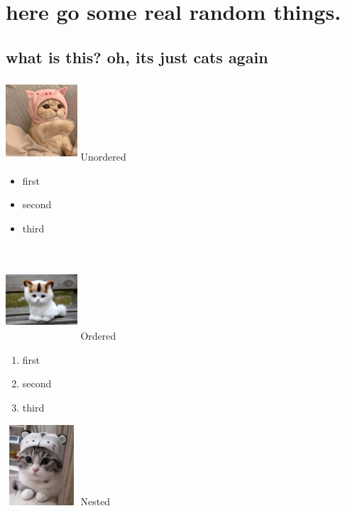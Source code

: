 \documentclass[10pt,a4paper]{report}
\begin{document}
\chapter{here go some real random things.}
\section{what is this? oh, its just cats again}
\includegraphics[width=0.2\textwidth, height=30mm]{images/1.jpg}
Unordered 
\begin{itemize}
    \item first 
    \item second
    \item third
\end{itemize} \\
\includegraphics[width=0.2\textwidth, height=30mm]{images/2.jpg}
Ordered 
\begin{enumerate}
    \item first
    \item second
    \item third
\end{enumerate}
\includegraphics[width=0.2\textwidth, height=30mm]{images/3.jpg}
Nested 
\end{document}

